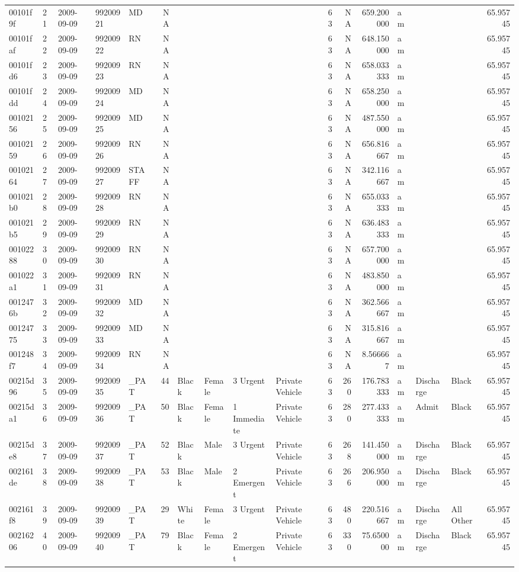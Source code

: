\documentclass[]{elsarticle} %
\begin{document}
\begin{longtable}[]{@{}lllllrllllrrrlllr@{}}
00101f9f & 21 & 2009-09-09 & 99200921 & MD & NA & & & & & 63 & NA &
659.200000 & am & & & 65.95745\tabularnewline
00101faf & 22 & 2009-09-09 & 99200922 & RN & NA & & & & & 63 & NA &
648.150000 & am & & & 65.95745\tabularnewline
00101fd6 & 23 & 2009-09-09 & 99200923 & RN & NA & & & & & 63 & NA &
658.033333 & am & & & 65.95745\tabularnewline
00101fdd & 24 & 2009-09-09 & 99200924 & MD & NA & & & & & 63 & NA &
658.250000 & am & & & 65.95745\tabularnewline
00102156 & 25 & 2009-09-09 & 99200925 & MD & NA & & & & & 63 & NA &
487.550000 & am & & & 65.95745\tabularnewline
00102159 & 26 & 2009-09-09 & 99200926 & RN & NA & & & & & 63 & NA &
656.816667 & am & & & 65.95745\tabularnewline
00102164 & 27 & 2009-09-09 & 99200927 & STAFF & NA & & & & & 63 & NA &
342.116667 & am & & & 65.95745\tabularnewline
001021b0 & 28 & 2009-09-09 & 99200928 & RN & NA & & & & & 63 & NA &
655.033333 & am & & & 65.95745\tabularnewline
001021b5 & 29 & 2009-09-09 & 99200929 & RN & NA & & & & & 63 & NA &
636.483333 & am & & & 65.95745\tabularnewline
00102288 & 30 & 2009-09-09 & 99200930 & RN & NA & & & & & 63 & NA &
657.700000 & am & & & 65.95745\tabularnewline
001022a1 & 31 & 2009-09-09 & 99200931 & RN & NA & & & & & 63 & NA &
483.850000 & am & & & 65.95745\tabularnewline
0012476b & 32 & 2009-09-09 & 99200932 & MD & NA & & & & & 63 & NA &
362.566667 & am & & & 65.95745\tabularnewline
00124775 & 33 & 2009-09-09 & 99200933 & MD & NA & & & & & 63 & NA &
315.816667 & am & & & 65.95745\tabularnewline
001248f7 & 34 & 2009-09-09 & 99200934 & RN & NA & & & & & 63 & NA &
8.566667 & am & & & 65.95745\tabularnewline
00215d96 & 35 & 2009-09-09 & 99200935 & \_PAT & 44 & Black & Female & 3
Urgent & Private Vehicle & 63 & 260 & 176.783333 & am & Discharge &
Black & 65.95745\tabularnewline
00215da1 & 36 & 2009-09-09 & 99200936 & \_PAT & 50 & Black & Female & 1
Immediate & Private Vehicle & 63 & 280 & 277.433333 & am & Admit & Black
& 65.95745\tabularnewline
00215de8 & 37 & 2009-09-09 & 99200937 & \_PAT & 52 & Black & Male & 3
Urgent & Private Vehicle & 63 & 268 & 141.450000 & am & Discharge &
Black & 65.95745\tabularnewline
002161de & 38 & 2009-09-09 & 99200938 & \_PAT & 53 & Black & Male & 2
Emergent & Private Vehicle & 63 & 266 & 206.950000 & am & Discharge &
Black & 65.95745\tabularnewline
002161f8 & 39 & 2009-09-09 & 99200939 & \_PAT & 29 & White & Female & 3
Urgent & Private Vehicle & 63 & 480 & 220.516667 & am & Discharge & All
Other & 65.95745\tabularnewline
00216206 & 40 & 2009-09-09 & 99200940 & \_PAT & 79 & Black & Female & 2
Emergent & Private Vehicle & 63 & 330 & 75.650000 & am & Discharge &
Black & 65.95745\tabularnewline

\end{longtable}
\end{document}
